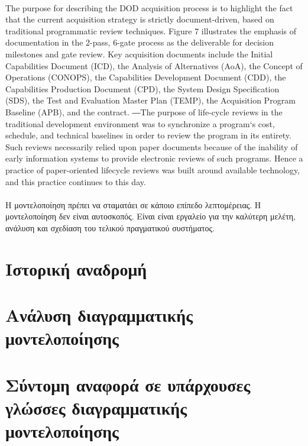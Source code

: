 \documentclass[a4paper,12pt,twoside]{report}
\begin{document}
{			\paragraph{} {The purpose for describing the DOD acquisition process is to highlight the fact that the current acquisition strategy is strictly document-driven, based on traditional programmatic review techniques. Figure 7 illustrates the emphasis of documentation in the 2-pass, 6-gate process as the deliverable for decision milestones and gate review. Key acquisition documents include the Initial Capabilities Document (ICD), the Analysis of Alternatives (AoA), the Concept of Operations (CONOPS), the Capabilities Development Document (CDD), the Capabilities Production Document (CPD), the System Design Specification (SDS), the Test and Evaluation Master Plan (TEMP), the Acquisition Program Baseline (APB), and the contract. ―The purpose of life-cycle reviews in the traditional development environment was to synchronize a program‘s cost, schedule, and technical baselines in order to review the program in its entirety. Such reviews necessarily relied upon paper documents because of the inability of early information systems to provide electronic reviews of such programs. Hence a practice of paper-oriented lifecycle reviews was built around available technology, and this practice continues to this day. \cite{MDSysDevelIBM}
			}
			
			\paragraph{} {Η μοντελοποίηση πρέπει να σταματάει σε κάποιο επίπεδο λεπτομέρειας. Η μοντελοποίηση δεν είναι αυτοσκοπός. Είναι είναι εργαλείο για την καλύτερη μελέτη, ανάλυση και σχεδίαση του τελικού πραγματικού συστήματος.
			}
			
		\section{Ιστορική αναδρομή}
		\section{Ανάλυση διαγραμματικής μοντελοποίησης}
		\section{Σύντομη αναφορά σε υπάρχουσες γλώσσες διαγραμματικής
μοντελοποίησης}
}
\end{document}
